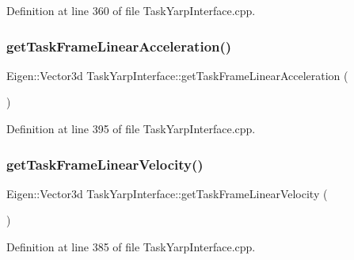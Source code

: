 Definition at line 360 of file Task\+Yarp\+Interface.\+cpp.

\hypertarget{classocra_1_1TaskYarpInterface_a798dc2edfbffa9759353dcc0afe96fff}{}\label{classocra_1_1TaskYarpInterface_a798dc2edfbffa9759353dcc0afe96fff} 
\subsubsection{\texorpdfstring{get\+Task\+Frame\+Linear\+Acceleration()}{getTaskFrameLinearAcceleration()}}
{\footnotesize\ttfamily Eigen\+::\+Vector3d Task\+Yarp\+Interface\+::get\+Task\+Frame\+Linear\+Acceleration (\begin{DoxyParamCaption}{ }\end{DoxyParamCaption})}



Definition at line 395 of file Task\+Yarp\+Interface.\+cpp.

\hypertarget{classocra_1_1TaskYarpInterface_ab7773bffb7b1cb3fc9968108afa30665}{}\label{classocra_1_1TaskYarpInterface_ab7773bffb7b1cb3fc9968108afa30665} 
\subsubsection{\texorpdfstring{get\+Task\+Frame\+Linear\+Velocity()}{getTaskFrameLinearVelocity()}}
{\footnotesize\ttfamily Eigen\+::\+Vector3d Task\+Yarp\+Interface\+::get\+Task\+Frame\+Linear\+Velocity (\begin{DoxyParamCaption}{ }\end{DoxyParamCaption})}



Definition at line 385 of file Task\+Yarp\+Interface.\+cpp.

\hypertarget{classocra_1_1TaskYarpInterface_a9878b0030948a97cacbe6aef76846a48}{}\label{classocra_1_1TaskYarpInterface_a9878b0030948a97cacbe6aef76846a48} 
